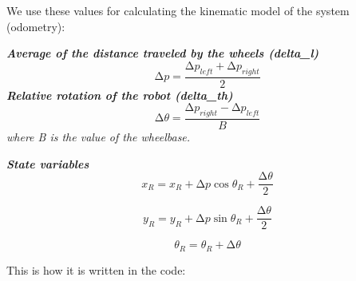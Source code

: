 We use these values for calculating the kinematic model of the system
(odometry):

\textbf{\emph{Average of the distance traveled by the wheels
(delta\_l)}} \[
∆p = \frac{∆p_{left} + ∆p_{right}}{2}
\] \textbf{\emph{Relative rotation of the robot (delta\_th)}} \[
∆θ = \frac{∆p_{right} − ∆p_{left}}{B}
\] \emph{where B is the value of the wheelbase.}

\textbf{\emph{State variables}} \[
x_R = x_R + ∆p \cos{\theta_R} + \frac{∆\theta}{2}
\]

\[
y_R = y_R + ∆p \sin{\theta_R} + \frac{∆\theta}{2}
\]

\[
\theta_R = \theta_R + ∆\theta
\]

This is how it is written in the code:

\begin{Shaded}
\begin{Highlighting}[]
\OperatorTok{=} \OperatorTok{(}\OperatorTok{+}\OperatorTok{)} \OperatorTok{/} \OperatorTok{;}
\OperatorTok{=} \OperatorTok{(}\OperatorTok{{-}}\OperatorTok{)} \OperatorTok{/} \OperatorTok{{-}\textgreater{}}\OperatorTok{;}

\OperatorTok{=}\OperatorTok{*}\OperatorTok{(}\OperatorTok{{-}\textgreater{}}\OperatorTok{+}\OperatorTok{/} \OperatorTok{);}
\OperatorTok{=}\OperatorTok{*}\OperatorTok{(}\OperatorTok{{-}\textgreater{}}\OperatorTok{+}\OperatorTok{/} \OperatorTok{);}

\OperatorTok{{-}\textgreater{}}\OperatorTok{=} \OperatorTok{{-}\textgreater{}}\OperatorTok{+}\OperatorTok{;}
\OperatorTok{{-}\textgreater{}}\OperatorTok{=} \OperatorTok{{-}\textgreater{}}\OperatorTok{+}\OperatorTok{;}
\OperatorTok{{-}\textgreater{}}\OperatorTok{=} \OperatorTok{{-}\textgreater{}}\OperatorTok{+}\OperatorTok{;}
\end{Highlighting}
\end{Shaded}

